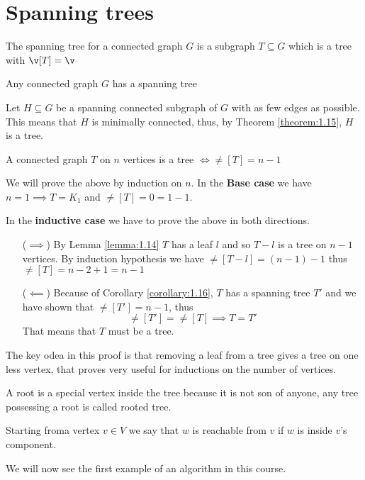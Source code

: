 \section{Spanning trees}
\begin{definition}
    The spanning tree for a connected graph $G$ is a subgraph $T \subseteq G$ which is a tree with $\v[T] = \v$
\end{definition}
\begin{corollary}
    \label{corollary:1.16}
    Any connected graph $G$ has a spanning tree
\end{corollary}
\begin{prf}
    Let $H \subseteq G$ be a spanning connected subgraph of $G$ with as few edges as possible. This means that $H$ is minimally connected, thus, by Theorem \ref{theorem:1.15}, $H$ is a tree.
\end{prf}
\begin{lemma}
    A connected graph $T$ on $n$ vertices is a tree $\iff \ne[T] = n - 1$
\end{lemma}
\begin{prf}
    We will prove the above by induction on $n$. In the \textbf{Base case} we have $n = 1 \implies T = K_1$ and $\ne[T] = 0 = 1 - 1$.

    In the \textbf{inductive case} we have to prove the above in both directions.
    \begin{itemize}
        \item [($\implies$)] By Lemma \ref{lemma:1.14} $T$ has a leaf $l$ and so $T - l$ is a tree on $n - 1$ vertices. By induction hypothesis we have $\ne[T - l] = (n - 1) - 1$ thus $\ne[T] = n - 2 + 1 = n - 1$
        \item [($\impliedby$)] Because of Corollary \ref{corollary:1.16}, $T$ has a spanning tree $T'$ and we have shown that $\ne[T'] = n - 1$, thus
        \begin{equation*}
            \ne[T'] = \ne[T] \implies T = T'
        \end{equation*}
        That means that $T$ must be a tree.
    \end{itemize}
\end{prf}
\begin{coolfact}
    The key odea in this proof is that removing a leaf from a tree gives a tree on one less vertex, that proves very useful for inductions on the number of vertices.
\end{coolfact}
\begin{definition}[Root]
    A root is a special vertex inside the tree because it is not son of anyone, any tree possessing a root is called rooted tree.
\end{definition}
\begin{definition}[Reachability]
    Starting froma  vertex $v \in V$ we say that $w$ is reachable from $v$ if $w$ is inside $v$'s component.
\end{definition}
We will now see the first example of an algorithm in this course.
